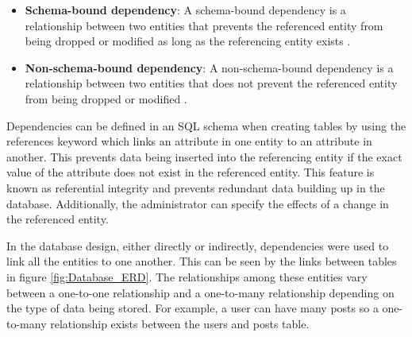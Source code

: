 \begin{itemize}
    \item \textbf{Schema-bound dependency}: A schema-bound dependency is a relationship between two entities that prevents the referenced entity from being dropped or modified as long as the referencing entity exists \cite{Microsoft:Dependencies}.
    \item \textbf{Non-schema-bound dependency}: A non-schema-bound dependency is a relationship between two entities that does not prevent the referenced entity from being dropped or modified \cite{Microsoft:Dependencies}.
\end{itemize}

Dependencies can be defined in an SQL schema when creating tables by using the references keyword which links an attribute in one entity to an attribute in another. This prevents data being inserted into the referencing entity if the exact value of the attribute does not exist in the referenced entity. This feature is known as referential integrity and prevents redundant data building up in the database. Additionally, the administrator can specify the effects of a change in the referenced entity.

In the database design, either directly or indirectly, dependencies were used to link all the entities to one another. This can be seen by the links between tables in figure \ref{fig:Database_ERD}. The relationships among these entities vary between a one-to-one relationship and a one-to-many relationship depending on the type of data being stored. For example, a user can have many posts so a one-to-many relationship exists between the users and posts table.